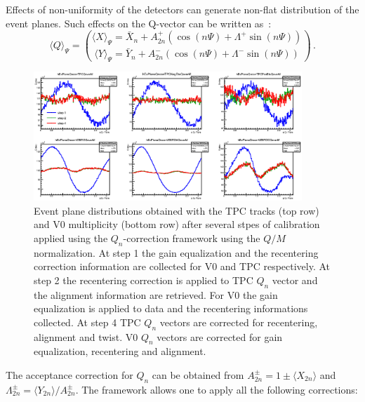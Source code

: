 Effects of non-uniformity of the detectors can generate 
non-flat distribution of the event planes. Such effects on the 
Q-vector can be written as~\cite{Selyuzhenkov:2007zi}:
\begin{equation}
\langle Q \rangle_{\Psi}={\langle X \rangle_{\Psi} =\bar{X}_n+A^+_{2n}(\cos
  (n\Psi)+\Lambda^+\sin (n\Psi))\choose \langle Y \rangle_{\Psi} =\bar{Y}_n+A^-_{2n}(\cos
  (n\Psi)+\Lambda^-\sin (n\Psi))}\,.
\end{equation}
\begin{figure}
\centering
 \includegraphics[width=0.9\textwidth]{FigCap5/EP_overMnorm.eps}
 \caption{Event plane distributions obtained with the TPC tracks (top row) and V0 multiplicity (bottom row) after several stpes of calibration applied using the $Q_n$-correction framework using the $Q/M$ normalization. At step 1 the gain equalization and the
   recentering correction
   information are collected for V0 and TPC respectively. At
   step 2 the recentering correction is applied to TPC $Q_n$ vector
   and the alignment information are retrieved. For V0 the gain
   equalization is applied to data and the recentering informations
   collected. At step 4 TPC $Q_n$ vectors are corrected for
   recentering, alignment and twist. V0 $Q_n$ vectors are corrected
   for gain equalization, recentering
   and alignment.}
   \label{fig:QoverMCalibration}
\end{figure}
The acceptance correction for $Q_n$ can be obtained from
$A^{\pm}_{2n}=1\pm \langle X_{2n} \rangle$ and $\Lambda^{\pm}_{2n}=
\langle Y_{2n} \rangle/A^{\pm}_{2n}$. The framework allows one to apply all the following corrections:
